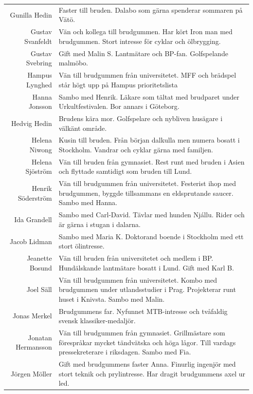 \documentclass[a5paper]{article}
\begin{document}
\begin{longtable}[l]{N|L}
				Gunilla Hedin	&	Faster till bruden. Dalabo som gärna spenderar sommaren på Vätö.	\\
				Gustav Svanfeldt	&	Vän och kollega till brudgummen. Har kört Iron man med brudgummen. Stort intresse för cyklar och ölbrygging.	\\
				Gustav Svebring	&	Gift med Malin S. Lantmätare och BP-fan. Golfspelande malmöbo.	\\
				Hampus Lynghed	&	Vän till brudgummen från universitetet. MFF och brädspel står högt upp på Hampus prioritetslista 	\\
				Hanna Jonsson	&	Sambo med Henrik. Läkare som tältat med brudparet under Urkultfestivalen. Bor annars i Göteborg. 	\\
				Hedvig Hedin	&	Brudens kära mor. Golfspelare och nybliven husägare i välkänt område.	\\
				Helena Niwong	&	Kusin till bruden. Från början dalkulla men numera bosatt i Stockholm. Vandrar och cyklar gärna med familjen.	\\
				Helena Sjöström	&	Vän till bruden från gymnasiet. Rest runt med bruden i Asien och flyttade samtidigt som bruden till Lund.	\\
				Henrik Söderström	&	Vän till brudgummen från universitetet. Festerist ihop med brudgummen, byggde tillsammans en eldsprutande saucer. Sambo med Hanna.	\\
				Ida Grandell	&	Sambo med Carl-David. Tävlar med hunden Njállu. Rider och är gärna i stugan i dalarna.	\\
				Jacob Lidman	&	Sambo med Maria K. Doktorand boende i Stockholm med ett stort ölintresse. 	\\
				Jeanette Bosund	&	Vän till bruden från universitetet och medlem i BP.  Hundälskande lantmätare bosatt i Lund. Gift med Karl B.	\\
				Joel Säll	&	Vän till brudgummen från universitetet. Kombo med brudgummen under utlandsstudier i Prag. Projekterar runt huset i Knivsta. Sambo med Malin.	\\
				Jonas Merkel	&	Brudgummens far. Nyfunnet MTB-intresse och tvåfaldig svensk klassiker-medaljör.	\\
				Jonatan Hermansson	&	Vän till brudgummen från gymnasiet. Grillmästare som förespråkar mycket tändvätska och höga lågor. Till vardags pressekreterare i riksdagen. Sambo med Fia.	\\
				Jörgen Möller	&	Gift med brudgummens faster Anna. Finurlig ingenjör med stort teknik och prylintresse. Har dragit brudgummens axel ur led.	\\

\end{longtable}
\end{document}
